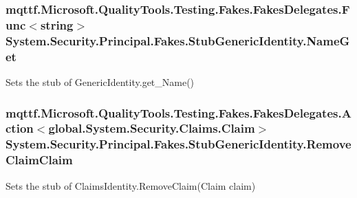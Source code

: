 \hypertarget{class_system_1_1_security_1_1_principal_1_1_fakes_1_1_stub_generic_identity_a2a2891d6441b224bc324c62d9fe72c1f}{
\subsubsection[{Name\-Get}]{\setlength{\rightskip}{0pt plus 5cm}mqttf.\-Microsoft.\-Quality\-Tools.\-Testing.\-Fakes.\-Fakes\-Delegates.\-Func$<$string$>$ System.\-Security.\-Principal.\-Fakes.\-Stub\-Generic\-Identity.\-Name\-Get}}\label{class_system_1_1_security_1_1_principal_1_1_fakes_1_1_stub_generic_identity_a2a2891d6441b224bc324c62d9fe72c1f}


Sets the stub of Generic\-Identity.\-get\-\_\-\-Name()

\hypertarget{class_system_1_1_security_1_1_principal_1_1_fakes_1_1_stub_generic_identity_a3f5f4a5f9eb661bc3484e97a9a20c044}{
\subsubsection[{Remove\-Claim\-Claim}]{\setlength{\rightskip}{0pt plus 5cm}mqttf.\-Microsoft.\-Quality\-Tools.\-Testing.\-Fakes.\-Fakes\-Delegates.\-Action$<$global.\-System.\-Security.\-Claims.\-Claim$>$ System.\-Security.\-Principal.\-Fakes.\-Stub\-Generic\-Identity.\-Remove\-Claim\-Claim}}\label{class_system_1_1_security_1_1_principal_1_1_fakes_1_1_stub_generic_identity_a3f5f4a5f9eb661bc3484e97a9a20c044}


Sets the stub of Claims\-Identity.\-Remove\-Claim(\-Claim claim)

